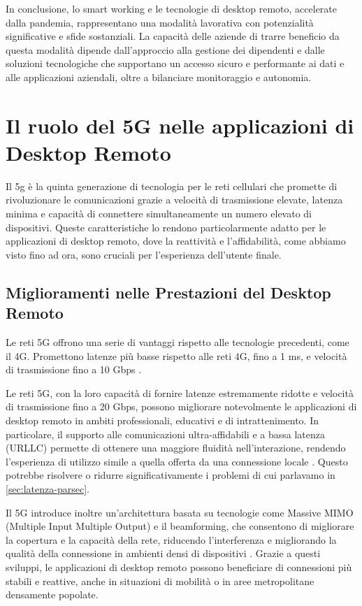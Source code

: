 \documentclass[12pt,a4paper,openright,twoside]{book}
\begin{document}
In conclusione, lo smart working e le tecnologie di desktop remoto, accelerate dalla pandemia, rappresentano una modalità lavorativa con potenzialità significative e sfide sostanziali. La capacità delle aziende di trarre beneficio da questa modalità dipende dall’approccio alla gestione dei dipendenti e dalle soluzioni tecnologiche che supportano un accesso sicuro e performante ai dati e alle applicazioni aziendali, oltre a bilanciare monitoraggio e autonomia.



\section{Il ruolo del 5G nelle applicazioni di Desktop Remoto}
\label{sec:5g}

Il 5g è la quinta generazione di tecnologia per le reti cellulari che promette di rivoluzionare le comunicazioni grazie a velocità di trasmissione elevate, latenza minima e capacità di connettere simultaneamente un numero elevato di dispositivi. Queste caratteristiche lo rendono particolarmente adatto per le applicazioni di desktop remoto, dove la reattività e l'affidabilità, come abbiamo visto fino ad ora, sono cruciali per l'esperienza dell'utente finale.

\subsection{Miglioramenti nelle Prestazioni del Desktop Remoto}

Le reti 5G offrono una serie di vantaggi rispetto alle tecnologie precedenti, come il 4G. Promettono latenze più basse rispetto alle reti 4G, fino a 1 ms, e velocità di trasmissione fino a 10 Gbps \cite{Dangi2021}. 

Le reti 5G, con la loro capacità di fornire latenze estremamente ridotte e velocità di trasmissione fino a 20 Gbps, possono migliorare notevolmente le applicazioni di desktop remoto in ambiti professionali, educativi e di intrattenimento. In particolare, il supporto alle comunicazioni ultra-affidabili e a bassa latenza (URLLC) permette di ottenere una maggiore fluidità nell’interazione, rendendo l’esperienza di utilizzo simile a quella offerta da una connessione locale \cite{Dangi2021, Sahu2024}. Questo potrebbe risolvere o ridurre significativamente i problemi di cui parlavamo in \ref{sec:latenza-parsec}.

Il 5G introduce inoltre un'architettura basata su tecnologie come Massive MIMO (Multiple Input Multiple Output) e il beamforming, che consentono di migliorare la copertura e la capacità della rete, riducendo l'interferenza e migliorando la qualità della connessione in ambienti densi di dispositivi \cite{Dangi2021}. Grazie a questi sviluppi, le applicazioni di desktop remoto possono beneficiare di connessioni più stabili e reattive, anche in situazioni di mobilità o in aree metropolitane densamente popolate.
\end{document}

